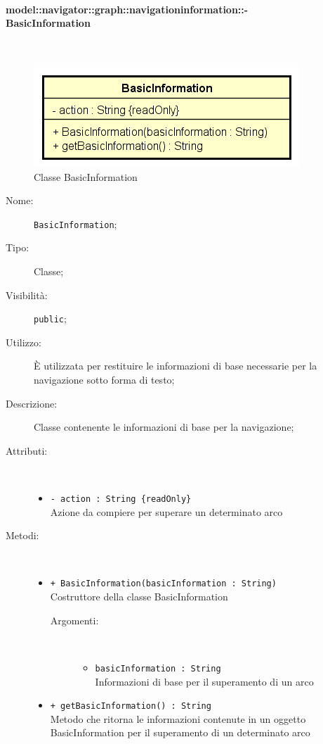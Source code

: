 \documentclass[../DefinizioneDiProdotto.tex]{subfiles}
\begin{document}
\paragraph{model::navigator::graph::navigationinformation::-\\BasicInformation}
\
\begin{figure}[H]
	\centering
	\includegraphics[width=\maxwidth]{img/BasicInformation.png}
	\caption{Classe BasicInformation}\label{fig:model::navigator::graph::navigationinformation::BasicInformation} 
\end{figure}
\begin{description}
	\item[Nome:] \texttt{BasicInformation};
	\item[Tipo:] Classe;
	\item[Visibilità:] \texttt{public};
	\item[Utilizzo:] È utilizzata per restituire le informazioni di base necessarie per la navigazione sotto forma di testo;
	\item[Descrizione:] Classe contenente le informazioni di base per la navigazione;
	\item[Attributi:] \
	\begin{itemize}
		\item \texttt{- action : String \{readOnly\}}\\
		Azione da compiere per superare un determinato arco
		
	\end{itemize}
	\item[Metodi:] \
	\begin{itemize}
		\item \texttt{+ BasicInformation(basicInformation : String)}\\
		Costruttore della classe BasicInformation
		\begin{description}
			\item[Argomenti:] \
			\begin{itemize}
				\item \texttt{basicInformation : String}\\
				Informazioni di base per il superamento di un arco\end{itemize}
		\end{description}
		\item \texttt{+ getBasicInformation() : String}\\
		Metodo che ritorna le informazioni contenute in un oggetto BasicInformation per il superamento di un determinato arco
	\end{itemize}
\end{description}
\end{document}
